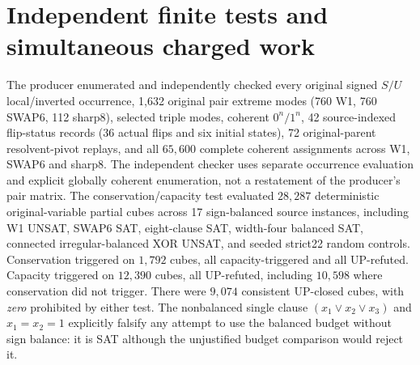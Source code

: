 \documentclass[10pt]{article}
\begin{document}
\section{Independent finite tests and simultaneous charged work}
The producer enumerated and independently checked every original signed $S/U$ local/inverted occurrence, 1,632 original pair extreme modes (760 W1, 760 SWAP6, 112 sharp8), selected triple modes, coherent $0^n/1^n$, 42 source-indexed flip-status records (36 actual flips and six initial states), 72 original-parent resolvent-pivot replays, and all $65{,}600$ complete coherent assignments across W1, SWAP6 and sharp8. The independent checker uses separate occurrence evaluation and explicit globally coherent enumeration, not a restatement of the producer's pair matrix.
The conservation/capacity test evaluated $28{,}287$ deterministic original-variable partial cubes across 17 sign-balanced source instances, including W1 UNSAT, SWAP6 SAT, eight-clause SAT, width-four balanced SAT, connected irregular-balanced XOR UNSAT, and seeded strict22 random controls. Conservation triggered on $1{,}792$ cubes, all capacity-triggered and all UP-refuted. Capacity triggered on $12{,}390$ cubes, all UP-refuted, including $10{,}598$ where conservation did not trigger. There were $9{,}074$ consistent UP-closed cubes, with \emph{zero} prohibited by either test. The nonbalanced single clause $(x_1\vee x_2\vee x_3)$ and $x_1=x_2=1$ explicitly falsify any attempt to use the balanced budget without sign balance: it is SAT although the unjustified budget comparison would reject it.
\end{document}

